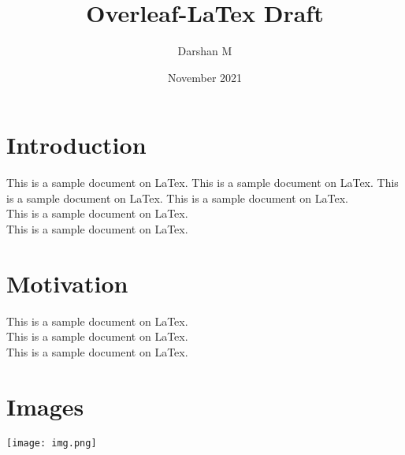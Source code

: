 \documentclass[8pt,a4paper]{article}
\title{Overleaf-LaTex Draft}
\author{Darshan M}
\date{November 2021}
\begin{document}
\maketitle


\section{Introduction}
This is a sample document on LaTex. 
This is a sample document on LaTex. 
This is a sample document on LaTex. 
This is a sample document on LaTex.\\
This is a sample document on LaTex. \\
This is a sample document on LaTex. 

\section{Motivation}
This is a sample document on LaTex.\\
This is a sample document on LaTex. \\
This is a sample document on LaTex. 

\section{Images}
\texttt{[image: img.png]}
\end{document}
